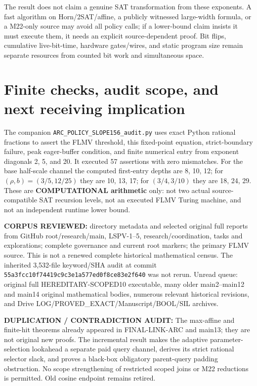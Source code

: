 \documentclass[11pt]{article}
\begin{document}
The result does not claim a genuine SAT transformation from these exponents. A fast algorithm on Horn/2SAT/affine, a publicly witnessed large-width formula, or a M22-only source may avoid all policy calls; if a lower-bound claim insists it must execute them, it needs an explicit source-dependent proof. Bit flips, cumulative live-bit-time, hardware gates/wires, and static program size remain separate resources from counted bit work and simultaneous space.

\section{Finite checks, audit scope, and next receiving implication}
The companion \texttt{ARC\_POLICY\_SLOPE156\_audit.py} uses exact Python rational fractions to assert the FLMV threshold, this fixed-point equation, strict-boundary failure, peak eager-buffer condition, and finite numerical entry from exponent diagonals 2, 5, and 20. It executed 57 assertions with zero mismatches. For the base half-scale channel the computed first-entry depths are 8, 10, 12; for $(\rho,b)=(3/5,12/25)$ they are 10, 13, 17; for $(3/4,3/10)$ they are 18, 24, 29. These are \textbf{COMPUTATIONAL arithmetic} only: not two actual source-compatible SAT recursion levels, not an executed FLMV Turing machine, and not an independent runtime lower bound.

\textbf{CORPUS REVIEWED:} directory metadata and selected original full reports from GitHub root/research/main, LSPV-1--5, research/coordination, tasks and explorations; complete governance and current root markers; the primary FLMV source. This is not a renewed complete historical mathematical census. The inherited 3,532-file keyword/SHA audit at commit \texttt{55a3fcc10f74419c9c3e1a577ed0f8ce83e2f640} was not rerun. Unread queue: original full HEREDITARY-SCOPED10 executable, many older main2--main12 and main14 original mathematical bodies, numerous relevant historical revisions, and Drive LOG/PROVED\_EXACT/Manuscript/BOOL/SIL archives.

\textbf{DUPLICATION / CONTRADICTION AUDIT:} The max-affine and finite-hit theorems already appeared in FINAL-LINK-ARC and main13; they are not original new proofs. The incremental result makes the adaptive parameter-selection lookahead a separate paid query channel, derives its strict rational selector slack, and proves a black-box obligatory parent-query padding obstruction. No scope strengthening of restricted scoped joins or M22 reductions is permitted. Old cosine endpoint remains retired.
\end{document}
